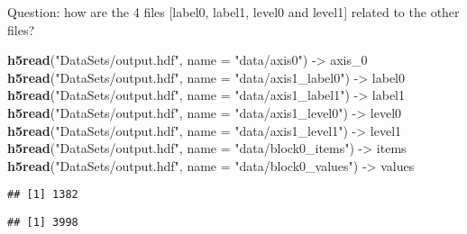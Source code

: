 \documentclass[]{article}
\newenvironment{Shaded}{\begin{snugshade}}{\end{snugshade}}
\newcommand{\DataTypeTok}[1]{\textcolor[rgb]{0.13,0.29,0.53}{#1}}
\newcommand{\DecValTok}[1]{\textcolor[rgb]{0.00,0.00,0.81}{#1}}
\newcommand{\KeywordTok}[1]{\textcolor[rgb]{0.13,0.29,0.53}{\textbf{#1}}}
\newcommand{\NormalTok}[1]{#1}
\newcommand{\OperatorTok}[1]{\textcolor[rgb]{0.81,0.36,0.00}{\textbf{#1}}}
\newcommand{\StringTok}[1]{\textcolor[rgb]{0.31,0.60,0.02}{#1}}
\begin{document}
Question: how are the 4 files {[}label0, label1, level0 and level1{]}
related to the other files?

\begin{Shaded}
\begin{Highlighting}[]
\KeywordTok{h5read}\NormalTok{(}\StringTok{"DataSets/output.hdf"}\NormalTok{, }\DataTypeTok{name =} \StringTok{"data/axis0"}\NormalTok{)  ->}\StringTok{ }\NormalTok{axis_}\DecValTok{0}
\KeywordTok{h5read}\NormalTok{(}\StringTok{"DataSets/output.hdf"}\NormalTok{, }\DataTypeTok{name =} \StringTok{"data/axis1_label0"}\NormalTok{)  ->}\StringTok{ }\NormalTok{label0}
\KeywordTok{h5read}\NormalTok{(}\StringTok{"DataSets/output.hdf"}\NormalTok{, }\DataTypeTok{name =} \StringTok{"data/axis1_label1"}\NormalTok{)  ->}\StringTok{ }\NormalTok{label1}
\KeywordTok{h5read}\NormalTok{(}\StringTok{"DataSets/output.hdf"}\NormalTok{, }\DataTypeTok{name =} \StringTok{"data/axis1_level0"}\NormalTok{)  ->}\StringTok{ }\NormalTok{level0}
\KeywordTok{h5read}\NormalTok{(}\StringTok{"DataSets/output.hdf"}\NormalTok{, }\DataTypeTok{name =} \StringTok{"data/axis1_level1"}\NormalTok{)  ->}\StringTok{ }\NormalTok{level1}
\KeywordTok{h5read}\NormalTok{(}\StringTok{"DataSets/output.hdf"}\NormalTok{, }\DataTypeTok{name =} \StringTok{"data/block0_items"}\NormalTok{)  ->}\StringTok{ }\NormalTok{items}
\KeywordTok{h5read}\NormalTok{(}\StringTok{"DataSets/output.hdf"}\NormalTok{, }\DataTypeTok{name =} \StringTok{"data/block0_values"}\NormalTok{) ->}\StringTok{ }\NormalTok{values}
\end{Highlighting}
\end{Shaded}

\begin{Shaded}
\end{Shaded}

\begin{verbatim}
## [1] 1382
\end{verbatim}

\begin{Shaded}
\end{Shaded}

\begin{verbatim}
## [1] 3998
\end{verbatim}
\end{document}
